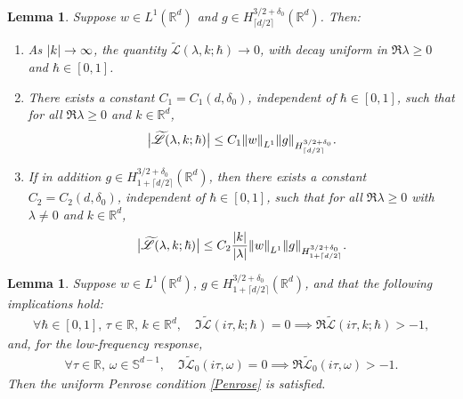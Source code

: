 \documentclass[10pt,a4paper]{article}
\newenvironment{enumeratea}
{\bgroup\def\theenumi{\alph{enumi}}\begin{enumerate}}
{\end{enumerate}\egroup}
\newcommand{\babs}[1]{\bigl|#1\bigr|}
\theoremstyle{plain}
\newtheorem{lemma}[theorem]{Lemma}
\theoremstyle{remark}
\newcommand{\ak}{\abs{k}}
\newcommand{\R}{\mathbb{R}}
\newcommand{\lam}{\lambda}
\newcommand{\ceils}[1]{\lceil#1\rceil}
\begin{document}
\begin{lemma}\label{boundedness and decay lemma}
Suppose $w\in L^1(\R^d)$ and $g\in H^{3/2+\delta_0}_{\ceils{d/2}}(\R^d)$. Then:\vspace*{-3pt}
\begin{enumeratea}
\item \label{(a)} As $\ak\to\infty$, the quantity $\widetilde {\mathscr L}(\lam,k;\hbar)\to0$, with decay uniform in $\Re\lam\geq0$ and $\hbar\in[0,1]$.

\item \label{(b)}There exists a constant $C_1=C_1(d,\delta_0)$, independent of $\hbar\in [0,1]$, such that for all $\Re\lam\geq0$ and $k\in\R^d$,\vspace*{-3pt}
\begin{align*}
\babs{\widetilde {\mathscr L}(\lam,k;\hbar)}\leq C_1\norm{w}_{L^1}\norm{g}_{H^{3/2+\delta_0}_{\ceils{d/2}}}.
\end{align*}
\item \label{(c)} If in addition $g\in H^{3/2+\delta_0}_{1+\ceils{d/2}}(\R^d)$, then there exists a constant $C_2=C_2(d,\delta_0)$, independent of $\hbar\in [0,1]$, such that for all $\Re\lam\geq0$ with $\lam\neq0$ and $k\in\R^d$,\vspace*{-3pt}
\begin{align*}
\babs{\widetilde {\mathscr L}(\lam,k;\hbar)}\leq C_2\frac{\ak}{\abs{\lam}}\norm{w}_{L^1}\norm{g}_{H^{3/2+\delta_0}_{1+\ceils{d/2}}}.
\end{align*}
\end{enumeratea}
\end{lemma}

\begin{lemma}\label{argumentprinciplelemma}
Suppose \( w \in L^1(\R^d) \), \( g \in H^{3/2+\delta_0}_{1+\lceil d/2 \rceil}(\R^d) \), and that the following implications hold:\begin{align}
\label{impliesPenrose}\forall\hbar\in[0,1],\,\tau\in\R,\,k\in\R^d,\quad \Im\widetilde {\mathscr L}(i\tau,k;\hbar)=0\implies \Re\widetilde {\mathscr L}(i\tau,k;\hbar)>-1,
\end{align}and, for the low-frequency response,
\begin{align}
\label{impliesPenrose0}\forall\tau\in\R,\,\omega\in\mathbb S^{d-1},\quad \Im\widetilde {\mathscr L}_0(i\tau,\omega)=0\implies \Re\widetilde {\mathscr L}_0(i\tau,\omega)>-1.
\end{align} Then the uniform Penrose condition \eqref{Penrose} is satisfied.
\end{lemma}
\end{document}
